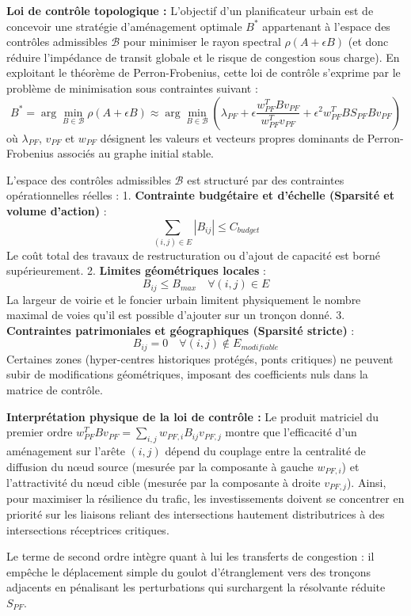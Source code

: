 \documentclass[10pt, a4paper]{article}
\begin{document}
\textbf{Loi de contrôle topologique :} L'objectif d'un planificateur
urbain est de concevoir une stratégie d'aménagement optimale \(B^*\)
appartenant à l'espace des contrôles admissibles \(\mathcal{B}\) pour
minimiser le rayon spectral \(\rho(A + \epsilon B)\) (et donc réduire
l'impédance de transit globale et le risque de congestion sous charge).
En exploitant le théorème de Perron-Frobenius, cette loi de contrôle
s'exprime par le problème de minimisation sous contraintes suivant :
\[B^* = \arg\min_{B \in \mathcal{B}} \rho(A + \epsilon B) \approx \arg\min_{B \in \mathcal{B}} \left( \lambda_{PF} + \epsilon \frac{w_{PF}^T B v_{PF}}{w_{PF}^T v_{PF}} + \epsilon^2 w_{PF}^T B S_{PF} B v_{PF} \right)\]
où \(\lambda_{PF}\), \(v_{PF}\) et \(w_{PF}\) désignent les valeurs et
vecteurs propres dominants de Perron-Frobenius associés au graphe
initial stable.

L'espace des contrôles admissibles \(\mathcal{B}\) est structuré par des
contraintes opérationnelles réelles : 1. \textbf{Contrainte budgétaire
et d'échelle (Sparsité et volume d'action)} :
\[\sum_{(i,j) \in E} |B_{ij}| \le C_{budget}\] Le coût total des travaux
de restructuration ou d'ajout de capacité est borné supérieurement. 2.
\textbf{Limites géométriques locales} :
\[B_{ij} \le B_{max} \quad \forall (i,j) \in E\] La largeur de voirie et
le foncier urbain limitent physiquement le nombre maximal de voies qu'il
est possible d'ajouter sur un tronçon donné. 3. \textbf{Contraintes
patrimoniales et géographiques (Sparsité stricte)} :
\[B_{ij} = 0 \quad \forall (i,j) \notin E_{modifiable}\] Certaines zones
(hyper-centres historiques protégés, ponts critiques) ne peuvent subir
de modifications géométriques, imposant des coefficients nuls dans la
matrice de contrôle.

\textbf{Interprétation physique de la loi de contrôle :} Le produit
matriciel du premier ordre
\(w_{PF}^T B v_{PF} = \sum_{i,j} w_{PF, i} B_{ij} v_{PF, j}\) montre que
l'efficacité d'un aménagement sur l'arête \((i, j)\) dépend du couplage
entre la centralité de diffusion du nœud source (mesurée par la
composante à gauche \(w_{PF, i}\)) et l'attractivité du nœud cible
(mesurée par la composante à droite \(v_{PF, j}\)). Ainsi, pour
maximiser la résilience du trafic, les investissements doivent se
concentrer en priorité sur les liaisons reliant des intersections
hautement distributrices à des intersections réceptrices critiques.

Le terme de second ordre intègre quant à lui les transferts de
congestion : il empêche le déplacement simple du goulot d'étranglement
vers des tronçons adjacents en pénalisant les perturbations qui
surchargent la résolvante réduite \(S_{PF}\).
\end{document}
